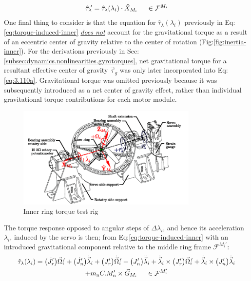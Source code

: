\begin{equation}\label{eq:tau-lambda-prime}
\hat{\tau}_{\lambda}\text{}\hspace{-2pt}'=\hat{\tau}_{\lambda}(\lambda_i)\cdot\hat{X}_{M_i}~~~~\in\mathcal{F}^{M_i}
\end{equation}
One final thing to consider is that the equation for $\hat{\tau}_\lambda(\lambda_i)$ previously in Eq:\ref{eq:torque-induced-inner} \underline{\emph{does not}} account for the gravitational torque as a result of an eccentric center of gravity relative to the center of rotation (Fig:\ref{fig:inertia-inner}). For the derivations previously in Sec:\ref{subsec:dynamics.nonlinearities.gyrotorques}, net gravitational torque for a resultant effective center of gravity $\vec{\tau}_g$ was only later incorporated into Eq:\ref{eq:3.110a}. Gravitational torque was omitted previously because it was subsequently introduced as a net center of gravity effect, rather than individual gravitational torque contributions for each motor module. 
\par
\begin{figure}[htpb]
\centering
\includegraphics[width=0.8\textwidth]{figs/torque-inner}
\caption{Inner ring torque test rig}
\label{fig:torque-inner}
\vspace{-14pt}
\end{figure}
\par
The torque response opposed to angular steps of $\Delta\lambda_i$, and hence its acceleration $\ddot{\lambda}_i$, induced by the servo is then; from Eq:\ref{eq:torque-induced-inner} with an introduced gravitational component relative to the middle ring frame $\mathcal{F}^{M_i'}$:
\begin{multline}\label{eq:model-inner}
\hat{\tau}_\lambda(\lambda_i)=\big(\dot{J}_{r}'\big)\vec{\Omega}_i\text{}\hspace{-2pt}'+\big(\dot{J}_{n}'\big)\dot{\vec{\lambda}}_i+\big(J_r'\big)\dot{\vec{\Omega}}_i\text{}\hspace{-2pt}'+\big(J_{n}'\big)\ddot{\vec{\lambda}}_i+\dot{\vec{\lambda}}_i\times \big(J_r'\big)\vec{\Omega}_i\text{}\hspace{-2pt}'+\dot{\vec{\lambda}}_i\times \big(J_{n}'\big)\dot{\vec{\lambda}}_i
\\
+m_\text{n}C.M'_{\text{n}}\times\vec{G}_{M_i}~~~~\in\mathcal{F}^{M_i'}
\end{multline}
